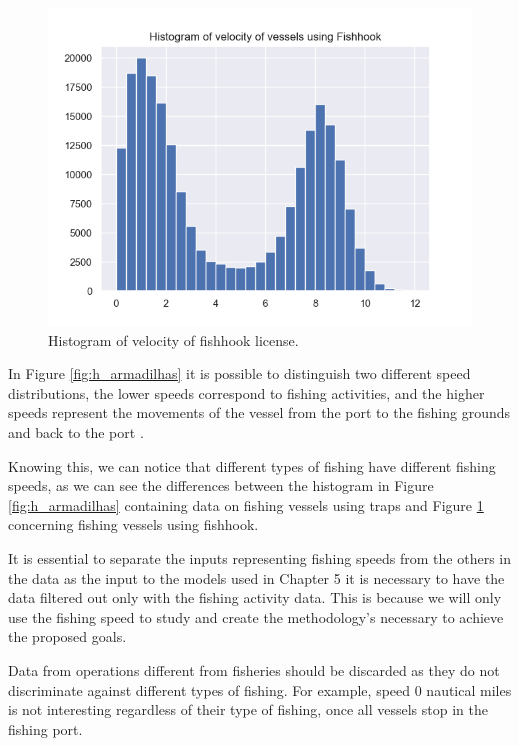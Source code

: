 \begin{figure}[h]
\centering
\includegraphics[width=0.8\linewidth]{Chapters/img/h_linha.png}
\caption{Histogram of velocity of fishhook license.}
\label{fig:h_linha}
\end{figure}

In Figure \ref{fig:h_armadilhas} it is possible to distinguish two different speed distributions, the lower speeds correspond to fishing activities, and the higher speeds represent the movements of the vessel from the port to the fishing grounds and back to the port \cite{MappingFishing}.





Knowing this, we can notice that different types of fishing have different fishing speeds, as we can see the differences between the histogram in Figure \ref{fig:h_armadilhas} containing data on fishing vessels using traps and Figure \ref{fig:h_linha} concerning fishing vessels using fishhook.





It is essential to separate the inputs representing fishing speeds from the others in the data as the input to the models used in Chapter 5 it is necessary to have the data filtered out only with the fishing activity data. This is because we will only use the fishing speed to study and create the methodology's necessary to achieve the proposed goals.

Data from operations different from fisheries should be discarded as they do not discriminate against different types of fishing. For example, speed 0 nautical miles is not interesting regardless of their type of fishing, once all vessels stop in the fishing port.







